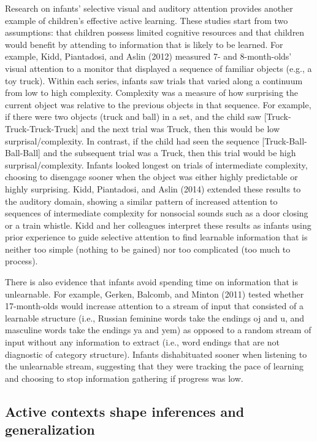 \documentclass[english,floatsintext,man]{apa6}
\theoremstyle{definition}
\theoremstyle{definition}
\theoremstyle{definition}
\theoremstyle{remark}
\begin{document}
Research on infants' selective visual and auditory attention provides
another example of children's effective active learning. These studies
start from two assumptions: that children possess limited cognitive
resources and that children would benefit by attending to information
that is likely to be learned. For example, Kidd, Piantadosi, and Aslin
(2012) measured 7- and 8-month-olds' visual attention to a monitor that
displayed a sequence of familiar objects (e.g., a toy truck). Within
each series, infants saw trials that varied along a continuum from low
to high complexity. Complexity was a measure of how surprising the
current object was relative to the previous objects in that sequence.
For example, if there were two objects (truck and ball) in a set, and
the child saw {[}Truck-Truck-Truck-Truck{]} and the next trial was
Truck, then this would be low surprisal/complexity. In contrast, if the
child had seen the sequence {[}Truck-Ball-Ball-Ball{]} and the
subsequent trial was a Truck, then this trial would be high
surprisal/complexity. Infants looked longest on trials of intermediate
complexity, choosing to disengage sooner when the object was either
highly predictable or highly surprising. Kidd, Piantadosi, and Aslin
(2014) extended these results to the auditory domain, showing a similar
pattern of increased attention to sequences of intermediate complexity
for nonsocial sounds such as a door closing or a train whistle. Kidd and
her colleagues interpret these results as infants using prior experience
to guide selective attention to find learnable information that is
neither too simple (nothing to be gained) nor too complicated (too much
to process).

There is also evidence that infants avoid spending time on information
that is unlearnable. For example, Gerken, Balcomb, and Minton (2011)
tested whether 17-month-olds would increase attention to a stream of
input that consisted of a learnable structure (i.e., Russian feminine
words take the endings oj and u, and masculine words take the endings ya
and yem) as opposed to a random stream of input without any information
to extract (i.e., word endings that are not diagnostic of category
structure). Infants dishabituated sooner when listening to the
unlearnable stream, suggesting that they were tracking the pace of
learning and choosing to stop information gathering if progress was low.

\subsection{Active contexts shape inferences and
generalization}\label{active-contexts-shape-inferences-and-generalization}
\end{document}
